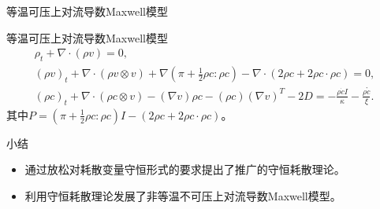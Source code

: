 \documentclass[mathserif]{beamer}
\begin{document}
\begin{frame}{等温可压上对流导数Maxwell模型}
\begin{block}{等温可压上对流导数Maxwell模型}
\begin{subequations} \label{eq:ECDFsecond}
		\begin{align*}
			\rho_t + \nabla \cdot (\rho v) = 0 ,\\
			(\rho v)_t + \nabla \cdot (\rho v \otimes v) + \nabla  (\pi + \frac{1}{2} \rho c: \rho c)  -  \nabla \cdot  (2 \rho c + 2 \rho c \cdot \rho c) =0 ,\\
			(\rho c)_t +  \nabla \cdot (\rho c \otimes v) - (\nabla v) \rho c - (\rho c) (\nabla v)^T - 2 D = - \frac{\rho \dot{c}I}{\kappa} -  \frac{\rho \mathring{c}}{\xi}  .
		\end{align*}
	\end{subequations}
	其中$ P= (\pi + \frac{1}{2} \rho c: \rho c) I  -   (2 \rho c + 2 \rho c \cdot \rho c)$。
	\end{block}
\end{frame}



\begin{frame}{小结}
\begin{itemize}
	\item<1-> 通过放松对耗散变量守恒形式的要求提出了推广的守恒耗散理论。
	\item<2-> 利用守恒耗散理论发展了非等温不可压上对流导数Maxwell模型。
\end{itemize}
\end{frame}
\end{document}
